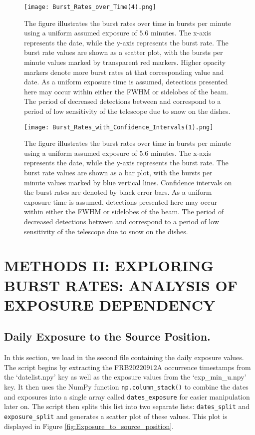 \documentclass[twocolumn]{aastex631}
\begin{document}
\begin{figure*}
    \centering
    \texttt{[image: Burst\_Rates\_over\_Time(4).png]}
    \caption{The figure illustrates the burst rates over time in bursts per minute using a uniform assumed exposure of $5.6$ minutes. The x-axis represents the date, while the y-axis represents the burst rate. The burst rate values are shown as a scatter plot, with the bursts per minute values marked by transparent red markers. Higher opacity markers denote more burst rates at that corresponding value and date. As a uniform exposure time is assumed, detections presented here may occur within either the FWHM or sidelobes of the beam. The period of decreased detections between  and  correspond to a period of low sensitivity of the telescope due to snow on the dishes.}
    \label{fig:Burst_Rates_over_Time}
\end{figure*}


\begin{figure*}
    \centering
    \texttt{[image: Burst\_Rates\_with\_Confidence\_Intervals(1).png]}
    \caption{The figure illustrates the burst rates over time in bursts per minute using a uniform assumed exposure of $5.6$ minutes. The x-axis represents the date, while the y-axis represents the burst rate. The burst rate values are shown as a bar plot, with the bursts per minute values marked by blue vertical lines. Confidence intervals on the burst rates are denoted by black error bars. As a uniform exposure time is assumed, detections presented here may occur within either the FWHM or sidelobes of the beam. The period of decreased detections between  and  correspond to a period of low sensitivity of the telescope due to snow on the dishes.}
    \label{fig:Burst_Rates_over_Time_confidence}
\end{figure*}

\section{METHODS II: EXPLORING BURST RATES: ANALYSIS OF EXPOSURE DEPENDENCY}
\label{sec:methods ii}
\subsection{Daily Exposure to the Source Position.} 
\indent In this section, we load in the second file containing the daily exposure values. The script begins by extracting the FRB$20220912$A occurrence timestamps from the `datelist.npy’ key as well as the exposure values from the `exp{\_}min{\_}u.npy’ key. It then uses the NumPy function \texttt{np.column{\_}stack()} to combine the dates and exposures into a single array called \texttt{dates{\_exposure}} for easier manipulation later on. The script then splits this list into two separate lists: \texttt{dates{\_}split} and \texttt{exposure{\_}split} and generates a scatter plot of these values. This plot is displayed in Figure \ref{fig:Exposure_to_source_position}.  
\end{document}
